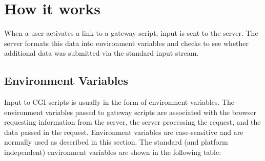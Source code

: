 \section{How it works}

When a user activates a link to a gateway script, input is sent to the server.
The server formats this data into environment variables and checks to see
whether additional data was submitted via the standard input stream.

\subsection{Environment Variables}

Input to CGI scripts is usually in the form of environment variables. The
environment variables passed to gateway scripts are associated with the browser
requesting information from the server, the server processing the request, and
the data passed in the request. Environment variables are case-sensitive and are
normally used as described in this section. The standard (and platform
independent) environment variables are shown in the following table:

